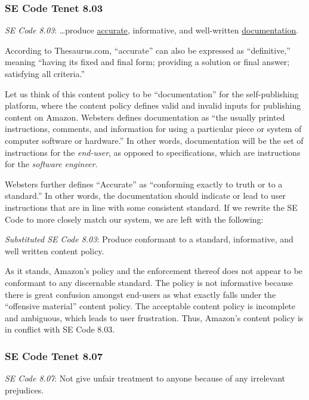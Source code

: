 \documentclass[11pt]{article}
\begin{document}
\begin{multicols}{2}
\subsubsection{SE Code Tenet 8.03}

\emph{SE Code 8.03}: \ldots produce \underline{accurate}, informative, and well-written \underline{documentation}. 

According to Thesaurus.com, ``accurate'' can also be expressed as ``definitive,'' meaning ``having its fixed and final form; providing a solution or final answer; satisfying all criteria.'' \cite{Thesaurus, Dictionary}  

Let us think of this content policy to be ``documentation'' for the self-publishing platform, where the content policy defines valid and invalid inputs for publishing content on Amazon.  Websters defines documentation as ``the usually printed instructions, comments, and information for using a particular piece or system of computer software or hardware.'' \cite{WebsterOnlineDict} In other words, documentation will be the set of instructions for the \emph{end-user}, as opposed to specifications, which are instructions for the \emph{software engineer}. 

Websters further defines ``Accurate'' as ``conforming exactly to truth or to a standard.'' \cite{WebsterOnlineDict} In other words, the documentation should indicate or lead to user instructions that are in line with some consistent standard.  If we rewrite the SE Code to more closely match our system, we are left with the following:

\emph{Substituted SE Code 8.03}: Produce conformant to a standard, informative, and well written content policy.

As it stands, Amazon's policy and the enforcement thereof does not appear to be conformant to any discernable standard.  The policy is not informative because there is great confusion amongst end-users as what exactly falls under the ``offensive material'' content policy.  \cite{KittSelfPubRevolution, ShermanAmazonExecs}  The acceptable content policy is incomplete and ambiguous, which leads to user frustration.  Thus, Amazon's content policy is in conflict with SE Code 8.03.

\subsubsection{SE Code Tenet 8.07}

\emph{SE Code 8.07}: Not give unfair treatment to anyone because of any irrelevant prejudices.


\end{multicols}
\end{document}
